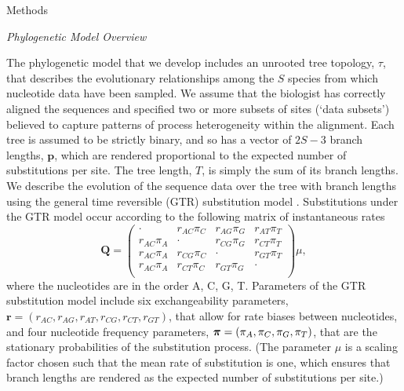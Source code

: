 \documentclass[11pt]{article}
\newcommand{\brmadd}[1]{{\color{blue}{#1}}}
\begin{document}
\bigskip

\begin{center}
{\sc Methods}
\end{center}

\begin{center}
{\it Phylogenetic Model Overview}
\end{center}

The phylogenetic model that we develop includes an unrooted tree topology, $\tau$, that describes the evolutionary relationships among the ${S}$ species from which nucleotide data have been sampled.
We assume that the biologist has correctly aligned the sequences and specified two or more subsets of sites (`data subsets') believed to capture patterns of process heterogeneity within the alignment.   
Each tree is assumed to be strictly binary, and so has a vector of $2S-3$ branch lengths, ${\mathbf p}$, which are rendered proportional to the expected number of substitutions per site.
The tree length, $T$, is simply the sum of its branch lengths.
We describe the evolution of the sequence data over the tree with branch lengths using the general time reversible (GTR) substitution model \citep{tavare86}.
Substitutions under the GTR model occur according to the following matrix of instantaneous rates
$$
{\mathbf Q} = \left( \begin{array}{cccc}
\cdot       & r_{AC}\pi_C & r_{AG}\pi_G & r_{AT}\pi_T \\
r_{AC}\pi_A & \cdot       & r_{CG}\pi_G & r_{CT}\pi_T \\
r_{AC}\pi_A & r_{CG}\pi_C & \cdot       & r_{GT}\pi_T \\
r_{AC}\pi_A & r_{CT}\pi_C & r_{GT}\pi_G & \cdot       \\
\end{array} \right) \mu,
$$
where the nucleotides are in the order A, C, G, T. 
Parameters of the GTR substitution model include six exchangeability parameters, ${\mathbf r} = (r_{AC}, r_{AG}, r_{AT}, r_{CG}, r_{CT}, r_{GT})$, that allow for rate biases between nucleotides, and four nucleotide frequency parameters, $\mbox{\boldmath$\pi$\unboldmath} = (\pi_A, \pi_C, \pi_G, \pi_T)$, that are the stationary probabilities of the substitution process. 
(The parameter $\mu$ is a scaling factor chosen such that the mean rate of substitution is one, which ensures that branch lengths are rendered as the expected number of substitutions per site.)
\end{document}
